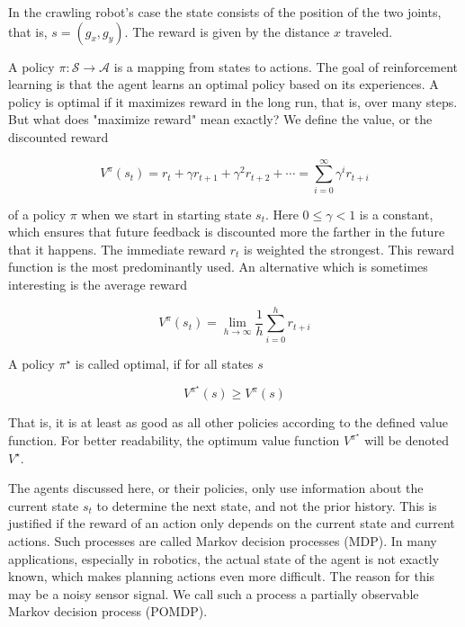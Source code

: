 \documentclass[10pt]{article}
\begin{document}
In the crawling robot's case the state consists of the position of the two joints, that is, $s=\left(g_{x}, g_{y}\right)$. The reward is given by the distance $x$ traveled.

A policy $\pi: \mathcal{S} \rightarrow \mathcal{A}$ is a mapping from states to actions. The goal of reinforcement learning is that the agent learns an optimal policy based on its experiences. A policy is optimal if it maximizes reward in the long run, that is, over many steps. But what does "maximize reward" mean exactly? We define the value, or the discounted reward


\begin{equation*}
V^{\pi}\left(s_{t}\right)=r_{t}+\gamma r_{t+1}+\gamma^{2} r_{t+2}+\cdots=\sum_{i=0}^{\infty} \gamma^{i} r_{t+i} \tag{10.1}
\end{equation*}


of a policy $\pi$ when we start in starting state $s_{t}$. Here $0 \leq \gamma<1$ is a constant, which ensures that future feedback is discounted more the farther in the future that it happens. The immediate reward $r_{t}$ is weighted the strongest. This reward function is the most predominantly used. An alternative which is sometimes interesting is the average reward


\begin{equation*}
V^{\pi}\left(s_{t}\right)=\lim _{h \rightarrow \infty} \frac{1}{h} \sum_{i=0}^{h} r_{t+i} \tag{10.2}
\end{equation*}


A policy $\pi^{\star}$ is called optimal, if for all states $s$


\begin{equation*}
V^{\pi^{\star}}(s) \geq V^{\pi}(s) \tag{10.3}
\end{equation*}


That is, it is at least as good as all other policies according to the defined value function. For better readability, the optimum value function $V^{\pi^{\star}}$ will be denoted $V^{\star}$.

The agents discussed here, or their policies, only use information about the current state $s_{t}$ to determine the next state, and not the prior history. This is justified if the reward of an action only depends on the current state and current actions. Such processes are called Markov decision processes (MDP). In many applications, especially in robotics, the actual state of the agent is not exactly known, which makes planning actions even more difficult. The reason for this may be a noisy sensor signal. We call such a process a partially observable Markov decision process (POMDP).
\end{document}
